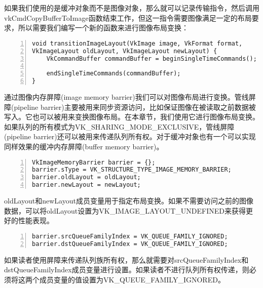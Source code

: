 \documentclass{ctexart}
\begin{document}
如果我们使用的是缓冲对象而不是图像对象，那么就可以记录传输指令，然后调用vkCmdCopyBufferToImage函数结束工作，但这一指令需要图像满足一定的布局要求，所以需要我们编写一个新的函数来进行图像布局变换：

\begin{lstlisting}[language={[ANSI]C},keywordstyle=\color{blue!70},commentstyle=\color{red!50!green!50!blue!50},frame=shadowbox, rulesepcolor=\color{red!20!green!20!blue!20},basicstyle=\small,numbers=left, numberstyle=\tiny,breaklines=true]
void transitionImageLayout(VkImage image, VkFormat format,
VkImageLayout oldLayout, VkImageLayout newLayout) {
	VkCommandBuffer commandBuffer = beginSingleTimeCommands();

	endSingleTimeCommands(commandBuffer);
}
\end{lstlisting}

通过图像内存屏障(image memory barrier)我们可以对图像布局进行变换。管线屏障(pipeline barrier)主要被用来同步资源访问，比如保证图像在被读取之前数据被写入。它也可以被用来变换图像布局。在本章节，我们使用它进行图像布局变换。如果队列的所有模式为VK\_SHARING\_MODE\_EXCLUSIVE，管线屏障(pipeline barrier)还可以被用来传递队列所有权。对于缓冲对象也有一个可以实现同样效果的缓冲内存屏障(buffer memory barrier)。

\begin{lstlisting}[language={[ANSI]C},keywordstyle=\color{blue!70},commentstyle=\color{red!50!green!50!blue!50},frame=shadowbox, rulesepcolor=\color{red!20!green!20!blue!20},basicstyle=\small,numbers=left, numberstyle=\tiny,breaklines=true]
VkImageMemoryBarrier barrier = {};
barrier.sType = VK_STRUCTURE_TYPE_IMAGE_MEMORY_BARRIER;
barrier.oldLayout = oldLayout;
barrier.newLayout = newLayout;
\end{lstlisting}

oldLayout和newLayout成员变量用于指定布局变换。如果不需要访问之前的图像数据，可以将oldLayout设置为VK\_IMAGE\_LAYOUT\_UNDEFINED来获得更好的性能表现。

\begin{lstlisting}[language={[ANSI]C},keywordstyle=\color{blue!70},commentstyle=\color{red!50!green!50!blue!50},frame=shadowbox, rulesepcolor=\color{red!20!green!20!blue!20},basicstyle=\small,numbers=left, numberstyle=\tiny,breaklines=true]
barrier.srcQueueFamilyIndex = VK_QUEUE_FAMILY_IGNORED;
barrier.dstQueueFamilyIndex = VK_QUEUE_FAMILY_IGNORED;
\end{lstlisting}

如果读者使用屏障来传递队列族所有权，那么就需要对srcQueueFamilyIndex和dstQueueFamilyIndex成员变量进行设置。如果读者不进行队列所有权传递，则必须将这两个成员变量的值设置为VK\_QUEUE\_FAMILY\_IGNORED。
\end{document}
